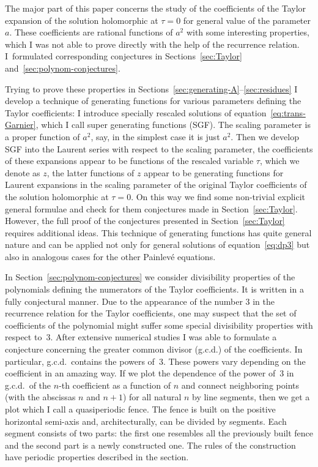 \documentclass[pdftex]{sigma}
\numberwithin{equation}{section}
\begin{document}
The major part of this paper concerns the study of the coefficients of the Taylor expansion of the
solution holomorphic at $\tau=0$ for general value of the parameter $a$. These coefficients are rational
functions of $a^2$ with some interesting properties, which I was not able to prove directly with the help of
the recurrence relation. I~formulated corresponding conjectures in
Sections~\ref{sec:Taylor} and~\ref{sec:polynom-conjectures}.

Trying to prove these properties in Sections~\ref{sec:generating-A}--\ref{sec:residues} I develop a technique
of generating functions for various parameters defining the Taylor coefficients: I introduce
specially rescaled solutions of equation~\eqref{eq:trans-Garnier}, which I call super generating functions (SGF).
The scaling parameter is a proper function of $a^2$, say, in the simplest case it is just $a^2$. Then we develop
SGF into the Laurent series with respect to the scaling parameter, the coefficients of these expansions appear
to be functions of the rescaled variable $\tau$, which we denote as $z$, the latter functions of $z$ appear to be
generating functions for Laurent expansions in the scaling parameter of the original Taylor coefficients of the
solution holomorphic at $\tau=0$. On this way we find some non-trivial explicit general formulae and check for
them conjectures made in Section~\ref{sec:Taylor}. However, the full proof of the conjectures presented in
Section~\ref{sec:Taylor} requires additional ideas. This technique of generating functions has quite general nature
and can be applied not only for general solutions of equation~\eqref{eq:dp3} but also in analogous cases for the
other Painlev\'e equations.

In Section~\ref{sec:polynom-conjectures} we consider divisibility properties of the polynomials defining the
numerators of the Taylor coefficients. It is written in a fully conjectural manner. Due to the appearance of
the number $3$ in the recurrence relation for the Taylor coefficients, one may suspect that the set of coefficients
of the polynomial might suffer some special divisibility properties with respect to~$3$. After extensive numerical
studies I was able to formulate a conjecture concerning the greater common divisor (g.c.d.) of the coefficients.
In particular, g.c.d.\ contains the powers of~$3$. These powers vary depending on the coefficient in an amazing
way. If we plot the dependence of the power of~$3$ in g.c.d.\ of the $n$-th coefficient as a function of $n$
and connect neighboring points (with the abscissas $n$ and $n+1$) for all natural $n$ by line segments, then we get
a plot which I call a quasiperiodic fence. The fence is built on the positive horizontal semi-axis and,
architecturally, can be divided by segments. Each segment consists of two parts: the first one resembles all the
previously built fence and the second part is a newly constructed one. The rules of the construction have periodic
properties described in the section.
\end{document}
